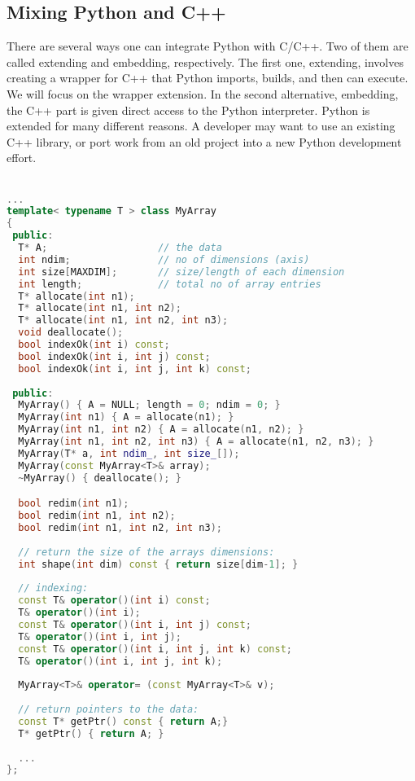 \subsection{Mixing Python and C++}
There are several ways one can integrate Python with C/C++. Two of them are called extending and embedding, respectively. The first one, extending, involves creating a wrapper for C++ that Python imports, builds, and then can execute. We will focus on the wrapper extension. In the second alternative, embedding, the C++ part is given direct access to the Python interpreter. Python is extended for many different reasons. A developer may want to use an existing C++ library, or port work from an old project into a new Python development effort.\\
\\
\begin{lstlisting}[language=c++]
...
template< typename T > class MyArray
{
 public:
  T* A;                   // the data
  int ndim;               // no of dimensions (axis)
  int size[MAXDIM];       // size/length of each dimension
  int length;             // total no of array entries
  T* allocate(int n1);
  T* allocate(int n1, int n2);
  T* allocate(int n1, int n2, int n3);
  void deallocate();
  bool indexOk(int i) const;      
  bool indexOk(int i, int j) const;
  bool indexOk(int i, int j, int k) const;
  
 public:
  MyArray() { A = NULL; length = 0; ndim = 0; }
  MyArray(int n1) { A = allocate(n1); }
  MyArray(int n1, int n2) { A = allocate(n1, n2); }
  MyArray(int n1, int n2, int n3) { A = allocate(n1, n2, n3); }
  MyArray(T* a, int ndim_, int size_[]);
  MyArray(const MyArray<T>& array);
  ~MyArray() { deallocate(); }

  bool redim(int n1);           
  bool redim(int n1, int n2);   
  bool redim(int n1, int n2, int n3);   
  
  // return the size of the arrays dimensions:
  int shape(int dim) const { return size[dim-1]; }
  
  // indexing:
  const T& operator()(int i) const;
  T& operator()(int i);
  const T& operator()(int i, int j) const;
  T& operator()(int i, int j);
  const T& operator()(int i, int j, int k) const;
  T& operator()(int i, int j, int k);
  
  MyArray<T>& operator= (const MyArray<T>& v);
  
  // return pointers to the data:
  const T* getPtr() const { return A;}   
  T* getPtr() { return A; }
  
  ...
};
\end{lstlisting}
